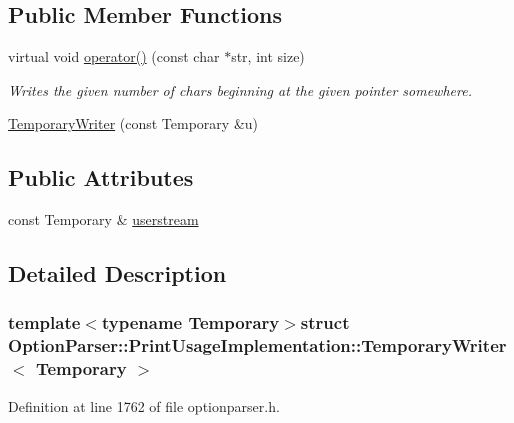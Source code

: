 \subsection*{Public Member Functions}
\begin{DoxyCompactItemize}
\item 
virtual void \hyperlink{struct_option_parser_1_1_print_usage_implementation_1_1_temporary_writer_acc6a8e8fe851b777549eee9e0e1c1532}{operator()} (const char $\ast$str, int size)
\begin{DoxyCompactList}\small\item\em Writes the given number of chars beginning at the given pointer somewhere. \end{DoxyCompactList}\item 
\hyperlink{struct_option_parser_1_1_print_usage_implementation_1_1_temporary_writer_a939e738200ad0e202a22338a4da09753}{Temporary\-Writer} (const Temporary \&u)
\end{DoxyCompactItemize}
\subsection*{Public Attributes}
\begin{DoxyCompactItemize}
\item 
const Temporary \& \hyperlink{struct_option_parser_1_1_print_usage_implementation_1_1_temporary_writer_ae8dc9ac085535183436307e3d2da6982}{userstream}
\end{DoxyCompactItemize}


\subsection{Detailed Description}
\subsubsection*{template$<$typename Temporary$>$struct Option\-Parser\-::\-Print\-Usage\-Implementation\-::\-Temporary\-Writer$<$ Temporary $>$}



Definition at line 1762 of file optionparser.\-h.



